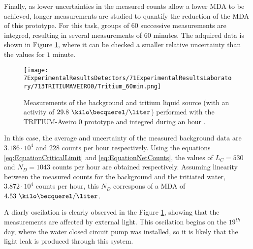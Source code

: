 Finally, as lower uncertainties in the measured counts allow a lower MDA to be achieved, longer measurements are studied to quantify the reduction of the MDA of this prototype. For this task, groups of 60 successive measurements are integred, resulting in several measurements of 60 minutes. The adquired data is shown in Figure \ref{fig:Tritium60min}, where it can be checked a smaller relative uncertainty than the values for $1$ minute.

\begin{figure}[h]
\centering
\texttt{[image: 7ExperimentalResultsDetectors/71ExperimentalResultsLaboratory/713TRITIUMAVEIRO0/Tritium\_60min.png]}
\caption{Measurements of the background and tritium liquid source (with an activity of $29.8~\kilo\becquerel/\liter$) performed with the TRITIUM-Aveiro 0 prototype and integred during an hour \cite{ExperimentalPaperCarlos}.\label{fig:Tritium60min}}
\end{figure}

In this case, the average and uncertainty of the measured background data are $3.186 \cdot{} 10^{4}$ and $228$ counts per hour respectively. Using the equations \ref{eq:EquationCriticalLimit} and \ref{eq:EquationNetCounts}, the values of $L_C=530$ and $N_D=1043$ counts per hour are obtained respectively. Assuming linearity between the measured counts for the background and the tritiated water, $3.872\cdot{}10^4$ counts per hour, this $N_D$ correspons of a MDA of $4.53~\kilo\becquerel/\liter$.

A diarly oscilation is clearly observed in the Figure \ref{fig:Tritium60min}, showing that the measurements are affected by external light. This oscilation begins on the $19^{th}$ day, where the water closed circuit pump was installed, so it is likely that the light leak is produced through this system.








